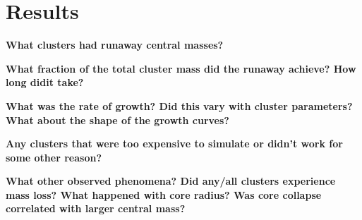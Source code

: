 \documentclass[preprint1]{aastex}
\numberwithin{equation}{section}
\begin{document}
\section{Results} \label{Results}

\textbf{What clusters had runaway central masses?}

\textbf{What fraction of the total cluster mass did the runaway achieve?  How long didit take?}

\textbf{What was the rate of growth?  Did this vary with cluster parameters?  What about the shape of the growth curves?}

\textbf{Any clusters that were too expensive to simulate or didn't work for some other reason?}

\textbf{What other observed phenomena?  Did any/all clusters experience mass loss?  What happened with core radius?  Was core collapse correlated with larger central mass?}





\end{document}
